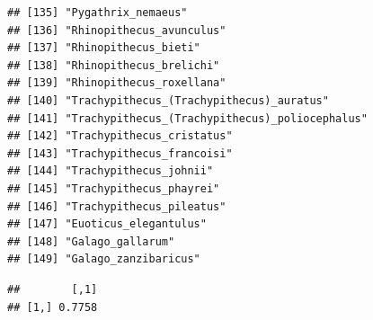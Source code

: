\documentclass[]{article}
\newenvironment{Shaded}{\begin{snugshade}}{\end{snugshade}}
\newcommand{\KeywordTok}[1]{\textcolor[rgb]{0.13,0.29,0.53}{\textbf{{#1}}}}
\newcommand{\DataTypeTok}[1]{\textcolor[rgb]{0.13,0.29,0.53}{{#1}}}
\newcommand{\DecValTok}[1]{\textcolor[rgb]{0.00,0.00,0.81}{{#1}}}
\newcommand{\NormalTok}[1]{{#1}}
\begin{document}
\begin{verbatim}
## [135] "Pygathrix_nemaeus"                            
## [136] "Rhinopithecus_avunculus"                      
## [137] "Rhinopithecus_bieti"                          
## [138] "Rhinopithecus_brelichi"                       
## [139] "Rhinopithecus_roxellana"                      
## [140] "Trachypithecus_(Trachypithecus)_auratus"      
## [141] "Trachypithecus_(Trachypithecus)_poliocephalus"
## [142] "Trachypithecus_cristatus"                     
## [143] "Trachypithecus_francoisi"                     
## [144] "Trachypithecus_johnii"                        
## [145] "Trachypithecus_phayrei"                       
## [146] "Trachypithecus_pileatus"                      
## [147] "Euoticus_elegantulus"                         
## [148] "Galago_gallarum"                              
## [149] "Galago_zanzibaricus"
\end{verbatim}

\begin{verbatim}
##        [,1]
## [1,] 0.7758
\end{verbatim}

\begin{Shaded}
\end{Shaded}
\end{document}
